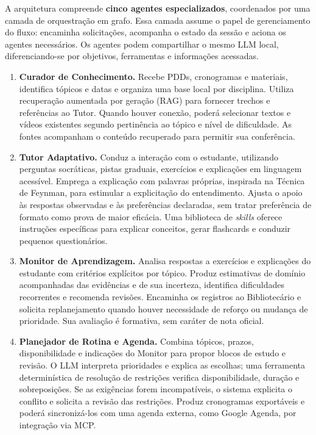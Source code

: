 \documentclass[12pt]{article}
\begin{document}
A arquitetura compreende \textbf{cinco agentes especializados}, coordenados por uma camada de orquestração em grafo. Essa camada assume o papel de gerenciamento do fluxo: encaminha solicitações, acompanha o estado da sessão e aciona os agentes necessários. Os agentes podem compartilhar o mesmo LLM local, diferenciando-se por objetivos, ferramentas e informações acessadas.

\begin{enumerate}
    \item \textbf{Curador de Conhecimento.} Recebe PDDs, cronogramas e materiais, identifica tópicos e datas e organiza uma base local por disciplina. Utiliza recuperação aumentada por geração (RAG) para fornecer trechos e referências ao Tutor. Quando houver conexão, poderá selecionar textos e vídeos existentes segundo pertinência ao tópico e nível de dificuldade. As fontes acompanham o conteúdo recuperado para permitir sua conferência.

    \item \textbf{Tutor Adaptativo.} Conduz a interação com o estudante, utilizando perguntas socráticas, pistas graduais, exercícios e explicações em linguagem acessível. Emprega a explicação com palavras próprias, inspirada na Técnica de Feynman, para estimular a explicitação do entendimento. Ajusta o apoio às respostas observadas e às preferências declaradas, sem tratar preferência de formato como prova de maior eficácia. Uma biblioteca de \textit{skills} oferece instruções específicas para explicar conceitos, gerar flashcards e conduzir pequenos questionários.

    \item \textbf{Monitor de Aprendizagem.} Analisa respostas a exercícios e explicações do estudante com critérios explícitos por tópico. Produz estimativas de domínio acompanhadas das evidências e de sua incerteza, identifica dificuldades recorrentes e recomenda revisões. Encaminha os registros ao Bibliotecário e solicita replanejamento quando houver necessidade de reforço ou mudança de prioridade. Sua avaliação é formativa, sem caráter de nota oficial.

    \item \textbf{Planejador de Rotina e Agenda.} Combina tópicos, prazos, disponibilidade e indicações do Monitor para propor blocos de estudo e revisão. O LLM interpreta prioridades e explica as escolhas; uma ferramenta determinística de resolução de restrições verifica disponibilidade, duração e sobreposições. Se as exigências forem incompatíveis, o sistema explicita o conflito e solicita a revisão das restrições. Produz cronogramas exportáveis e poderá sincronizá-los com uma agenda externa, como Google Agenda, por integração via MCP.


\end{enumerate}
\end{document}
